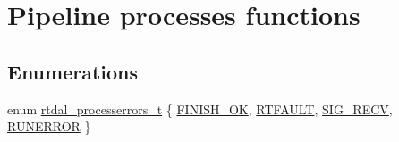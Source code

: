 \hypertarget{group__process}{\section{Pipeline processes functions}
\label{group__process}
}
\subsection*{Enumerations}
\begin{DoxyCompactItemize}
\item 
enum \hyperlink{group__process_ga825233f1e8a1bd1e1eb99e1301f36a57}{rtdal\-\_\-processerrors\-\_\-t} \{ \hyperlink{group__process_gga825233f1e8a1bd1e1eb99e1301f36a57a19307143c8bf8a95177f618b079e6f89}{F\-I\-N\-I\-S\-H\-\_\-\-O\-K}, 
\hyperlink{group__process_gga825233f1e8a1bd1e1eb99e1301f36a57a6be012806ba282ac6ae296d79a7693ea}{R\-T\-F\-A\-U\-L\-T}, 
\hyperlink{group__process_gga825233f1e8a1bd1e1eb99e1301f36a57a8b02f36385bd2fd5c4ce9efb7cbbb3a6}{S\-I\-G\-\_\-\-R\-E\-C\-V}, 
\hyperlink{group__process_gga825233f1e8a1bd1e1eb99e1301f36a57a0a0794af19e3059b3f02ca0eaca785d3}{R\-U\-N\-E\-R\-R\-O\-R}
 \}
\end{DoxyCompactItemize}
